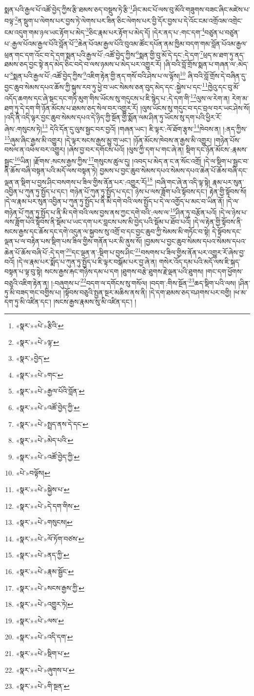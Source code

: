 སྨན་པའི་རྒྱལ་པོ་འཚོ་བྱེད་ཀྱིས་རྩི་ཐམས་ཅད་བསྡུས་ཏེ་རྩི་\footnote{«སྣར་»«པེ་»རྩིའི་}ཤིང་མང་པོ་ལས་བུ་མོའི་གཟུགས་བཟང་ཞིང་མཛེས་པ་བལྟ་\footnote{«སྣར་»«པེ་»ལྟ་}ན་སྡུག་པ་ལེགས་པར་བྱས་ཏེ་ལེགས་པར་ཟིན་ཅིང་ལེགས་པར་བྱི་དོར་བྱས་པ་དེ་འོང་ངམ་འགྲོའམ་འགྲེང་ངམ་འདུག་གམ་ཉལ་ཡང་རྟོག་པ་མེད་\footnote{«སྣར་»བྱེད་}ཅིང་རྣམ་པར་རྟོག་པ་མེད་དོ། །དེར་ནད་པ་:གང་དག་\footnote{«སྣར་»«པེ་»གང་}བཙུན་པ་བཙུན་པ་:རྒྱལ་པོའམ་རྒྱལ་པོའི་བློན་པོ་\footnote{«སྣར་»«པེ་»རྒྱལ་པོའི་བློན་}ཆེན་པོའམ་རྒྱལ་པོའི་བུའམ་ཚོང་དཔོན་ནམ་ཁྱིམ་བདག་གམ་བློན་པོའམ་རྒྱལ་ཕྲན་གང་དག་འོང་བ་དེ་དག་སྨན་པའི་རྒྱལ་པོ་:འཚོ་བྱེད་ཀྱིས་\footnote{«སྣར་»«པེ་»འཚོ་བྱེད་ཀྱི་}སྨན་གྱི་བུ་མོ་དེ་དང་:དེ་དག་\footnote{«སྣར་»«པེ་»སྤྲད་ནས་དེ་དང་}ཕྲད་མ་ཐག་ཏུ་ནད་ཐམས་ཅད་བྱང་སྟེ་ནད་མེད་ཅིང་བདེ་བ་ལས་ཉམས་པ་མེད་པར་འགྱུར་རོ། །ཞི་བའི་བློ་གྲོས་སྨན་པ་གཞན་ལ་:མེད་པ་\footnote{«སྣར་»«པེ་»མེད་པའི་}སྨན་པའི་རྒྱལ་པོ་:འཚོ་བྱེད་ཀྱིས་\footnote{«སྣར་»«པེ་»འཚོ་བྱེད་ཀྱི་}འཇིག་རྟེན་གྱི་ནད་གསོ་བའི་ཤེས་པ་ལ་ལྟོས།\footnote{«པེ་»བལྟོས།} ཞི་བའི་བློ་གྲོས་དེ་བཞིན་དུ་བྱང་ཆུབ་སེམས་དཔའ་ཆོས་ཀྱི་སྐུས་རབ་ཏུ་ཕྱེ་བ་ཡང་སེམས་ཅན་བུད་མེད་དང་:སྐྱེས་པ་དང་\footnote{«སྣར་»«པེ་»སྐྱེས་པ་}ཁྱེའུ་དང་བུ་མོ་འདོད་ཆགས་དང་ཞེ་སྡང་དང་གཏི་མུག་གིས་ཡོངས་སུ་གདུངས་པ་ཇི་སྙེད་པ་:དེ་དག་གི་\footnote{«སྣར་»«པེ་»དེ་དག་གིས་}ལུས་ལ་རེག་ན། རེག་མ་ཐག་ཏུ་དེ་དག་གི་ཉོན་མོངས་པ་ཐམས་ཅད་སེལ་བར་འགྱུར་རོ། །ལུས་ཡོངས་སུ་གདུང་བ་དང་བྲལ་བར་ཡང་ཤེས་སོ། །འདི་ནི་འདི་ལྟར་བྱང་ཆུབ་སེམས་དཔའ་དེ་ཉིད་ཀྱི་སྔོན་གྱི་སྨོན་ལམ་ཤིན་ཏུ་ཡོངས་སུ་དག་པའི་ཕྱིར་རོ་ཞེས་:གསུངས་ཏེ།\footnote{«སྣར་»«པེ་»གསུངས།} དེའི་དོན་དུ་ལུས་སྦྱང་བར་བྱའོ། །གཞན་ཡང་། ཇི་ལྟར་:ལོ་ཐོག་རྩྭས་\footnote{«སྣར་»«པེ་»ལོ་ཏོག་བཙས་}ཁེབས་ན། །:ནད་ཀྱིས་\footnote{«སྣར་»«པེ་»ནད་ཀྱི་}ཞུམ་ཞིང་རྒྱས་མི་འགྱུར། །དེ་ལྟར་སངས་རྒྱས་མྱུ་གུ་ཡང་། །ཉོན་མོངས་ཁེབས་ན་རྒྱས་མི་འགྱུར། །གཉེན་པོས་བསལ་ན་འཕེལ་བར་འགྱུར། །ཞེས་བྱ་བར་དགོངས་པའོ། །ལུས་ཀྱི་དག་པ་གང་ཞེ་ན། སྡིག་དང་ཉོན་མོངས་:རྣམས་སྦྱང་\footnote{«སྣར་»«པེ་»རྣམ་སྦྱོང་}ཡིན། །རྫོགས་:སངས་རྒྱས་ཀྱིས་\footnote{«སྣར་»«པེ་»སངས་རྒྱས་ཀྱི་}གསུངས་ཚུལ་དུ། །འབད་པ་མེད་ན་ང་ན་སོང་འགྲོ། །དེ་ལ་སྡིག་པ་སྦྱང་བ་ནི་ཆོས་བཞི་བསྟན་པའི་མདོ་ལས་བསྟན་ཏེ། བྱམས་པ་བྱང་ཆུབ་སེམས་དཔའ་སེམས་དཔའ་ཆེན་པོ་ཆོས་བཞི་དང་ལྡན་ན་སྡིག་པ་བྱས་ཤིང་བསགས་པ་ཟིལ་གྱིས་ནོན་པར་:འགྱུར་རོ།\footnote{«སྣར་»«པེ་»འགྱུར་ཏེ།} །བཞི་གང་ཞེ་ན་འདི་ལྟ་སྟེ། རྣམ་པར་སུན་འབྱིན་པ་ཀུན་ཏུ་སྤྱོད་པ་དང་། གཉེན་པོ་ཀུན་ཏུ་སྤྱོད་པ་དང་། ཉེས་པ་ལས་ཟློག་པའི་སྟོབས་དང་། རྟེན་གྱི་སྟོབས་སོ། །དེ་ལ་རྣམ་པར་སུན་འབྱིན་པ་ཀུན་ཏུ་སྤྱོད་པ་ནི་མི་དགེ་བའི་ལས་སྤྱོད་པ་དེ་ལ་འགྱོད་པ་མང་བ་ཡིན་ནོ། །དེ་ལ་གཉེན་པོ་ཀུན་ཏུ་སྤྱོད་པ་ནི་མི་དགེ་བའི་ལས་བྱས་ནས་ཀྱང་དགེ་བའི་:ལས་ལ་\footnote{«སྣར་»«པེ་»ལས་}ཤིན་ཏུ་བརྩོན་པའོ། །དེ་ལ་ཉེས་པ་ལས་ཟློག་པའི་སྟོབས་ནི་སྡོམ་པ་ཡང་དག་པར་བླངས་པས་མི་བྱེད་པའི་སྡོམ་པ་ཐོབ་པའོ། །དེ་ལ་རྟེན་གྱི་སྟོབས་ནི་སངས་རྒྱས་དང་ཆོས་དང་དགེ་འདུན་ལ་སྐྱབས་སུ་འགྲོ་བ་དང་བྱང་ཆུབ་ཀྱི་སེམས་མི་གཏོང་བ་སྟེ། དེ་སྟོབས་དང་ལྡན་པ་ལ་བརྟེན་པས་སྡིག་པས་ཟིལ་གྱིས་གནོན་པར་མི་ནུས་སོ། །བྱམས་པ་བྱང་ཆུབ་སེམས་དཔའ་སེམས་དཔའ་ཆེན་པོ་ཆོས་བཞི་པོ་:དེ་དག་\footnote{«སྣར་»«པེ་»འདི་དག་}དང་ལྡན་ན་:སྡིག་པ་བྱས་ཤིང་\footnote{«སྣར་»«པེ་»སྡིག་པ་}བསགས་པ་ཟིལ་གྱིས་ནོན་པར་འགྱུར་རོ་ཞེས་བྱ་བའོ། །དེ་ལ་རྣམ་པར་སྨོད་པ་ཀུན་ཏུ་སྤྱོད་པ་ཇི་ལྟར་བསྒོམ་པར་བྱ་ཞེ་ན། གསེར་འོད་དམ་པའི་མདོ་ལས་ཇི་སྐད་བསྟན་པ་ལྟ་བུ་སྟེ། སངས་རྒྱས་རྐང་གཉིས་དམ་པ་དག །ཐུགས་བརྩེ་ཐུགས་རྗེ་ལྡན་པའི་ཐུགས། །གང་དག་ཕྱོགས་བཅུའི་འཇིག་རྟེན་ན། །:བཞུགས་པ་\footnote{«སྣར་»«པེ་»ཞུགས་པ་}བདག་ལ་དགོངས་སུ་གསོལ། །བདག་:གིས་སྔོན་\footnote{«སྣར་»«པེ་»གི་སྔན་}ཆད་སྡིག་པའི་ལས། །ཤིན་ཏུ་མི་བཟད་གང་བགྱིས་པ། །སྟོབས་བཅུའི་སྤྱན་སྔར་མཆིས་ནས་ནི། །དེ་དག་ཐམས་ཅད་བཤགས་པར་བགྱི། །ཕ་མ་དག་ཏུ་མི་འཛིན་དང་། །སངས་རྒྱས་རྣམས་སུ་མི་འཛིན་དང་། །
